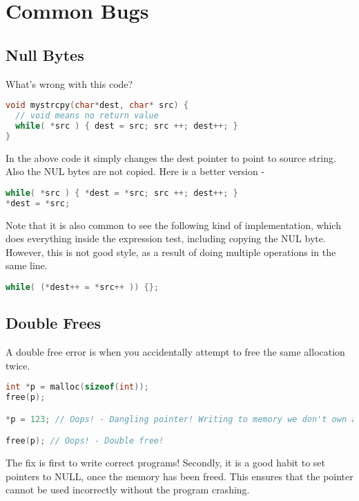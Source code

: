\section{Common Bugs}

\subsection{Null Bytes}

What's wrong with this code?

\begin{lstlisting}[language=C]
void mystrcpy(char*dest, char* src) {
  // void means no return value
  while( *src ) { dest = src; src ++; dest++; }
}
\end{lstlisting}

In the above code it simply changes the dest pointer to point to source string.
Also the NUL bytes are not copied.
Here is a better version -

\begin{lstlisting}[language=C]
while( *src ) { *dest = *src; src ++; dest++; }
*dest = *src;
\end{lstlisting}

Note that it is also common to see the following kind of implementation, which does everything inside the expression test, including copying the NUL byte.
However, this is not good style, as a result of doing multiple operations in the same line.

\begin{lstlisting}[language=C]
while( (*dest++ = *src++ )) {};
\end{lstlisting}

\subsection{Double Frees}

A double free error is when you accidentally attempt to free the same allocation twice.

\begin{lstlisting}[language=C]
int *p = malloc(sizeof(int));
free(p);

*p = 123; // Oops! - Dangling pointer! Writing to memory we don't own anymore

free(p); // Oops! - Double free!
\end{lstlisting}

The fix is first to write correct programs!
Secondly, it is a good habit to set pointers to NULL, once the memory has been freed.
This ensures that the pointer cannot be used incorrectly without the program crashing.

